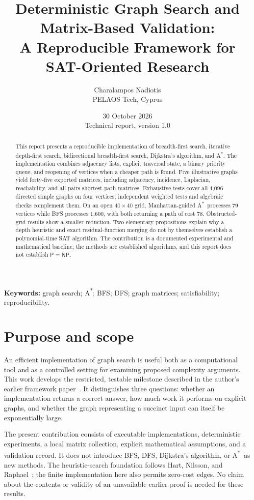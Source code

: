 \documentclass[11pt,a4paper]{article}
\title{Deterministic Graph Search and Matrix-Based Validation:\\A Reproducible Framework for SAT-Oriented Research}
\author{Charalampos Nadiotis\\PELAOS Tech, Cyprus}
\date{30 October 2026\\\small Technical report, version 1.0}
\newcommand{\astar}{A\textsuperscript{*}}
\newcommand{\NP}{\mathsf{NP}}
\newcommand{\PP}{\mathsf{P}}
\begin{document}
\maketitle
\begin{abstract}
This report presents a reproducible implementation of breadth-first search, iterative depth-first search, bidirectional breadth-first search, Dijkstra's algorithm, and \astar. The implementation combines adjacency lists, explicit traversal state, a binary priority queue, and reopening of vertices when a cheaper path is found. Five illustrative graphs yield forty-five exported matrices, including adjacency, incidence, Laplacian, reachability, and all-pairs shortest-path matrices. Exhaustive tests cover all 4,096 directed simple graphs on four vertices; independent weighted tests and algebraic checks complement them. On an open $40\times40$ grid, Manhattan-guided \astar\ processes 79 vertices while BFS processes 1,600, with both returning a path of cost 78. Obstructed-grid results show a smaller reduction. Two elementary propositions explain why a depth heuristic and exact residual-function merging do not by themselves establish a polynomial-time SAT algorithm. The contribution is a documented experimental and mathematical baseline; the methods are established algorithms, and this report does not establish $\PP=\NP$.
\end{abstract}
\noindent\textbf{Keywords:} graph search; \astar; BFS; DFS; graph matrices; satisfiability; reproducibility.

\section{Purpose and scope}
An efficient implementation of graph search is useful both as a computational tool and as a controlled setting for examining proposed complexity arguments. This work develops the restricted, testable milestone described in the author's earlier framework paper~\cite{nadiotis}. It distinguishes three questions: whether an implementation returns a correct answer, how much work it performs on explicit graphs, and whether the graph representing a succinct input can itself be exponentially large.

The present contribution consists of executable implementations, deterministic experiments, a local matrix collection, explicit mathematical assumptions, and a validation record. It does not introduce BFS, DFS, Dijkstra's algorithm, or \astar\ as new methods. The heuristic-search foundation follows Hart, Nilsson, and Raphael~\cite{hart}; the finite implementation here also permits zero-cost edges. No claim about the contents or validity of an unavailable earlier proof is needed for these results.
\end{document}
